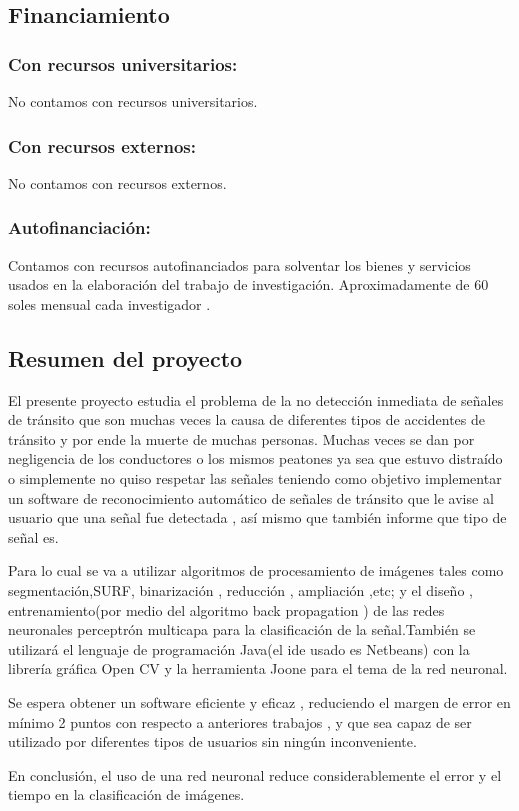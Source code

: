 \documentclass[a4paper, 12pt]{article}
\begin{document}
\subsection{Financiamiento}
\subsubsection{ {\bf	Con recursos universitarios:}}  No contamos con recursos universitarios.
\subsubsection{ {\bf Con recursos externos:}} No contamos con recursos externos.
\subsubsection{ {\bf Autofinanciación:}} Contamos con recursos autofinanciados para solventar los bienes y servicios usados en la elaboración del trabajo de investigación. Aproximadamente de 60 soles mensual cada investigador .

\subsection{Resumen del proyecto}
El presente proyecto estudia el problema de la no detección inmediata de señales de tránsito que son muchas veces la causa de diferentes tipos de accidentes de tránsito y por ende la muerte de muchas personas. Muchas veces se dan por negligencia de los conductores o los mismos peatones ya sea que estuvo distraído o simplemente no quiso respetar las señales teniendo como objetivo implementar un software de reconocimiento automático de señales de tránsito que le avise al usuario que una señal fue detectada , así mismo que también informe que tipo de señal es.\par
\vskip 0.6cm
Para lo cual se va a utilizar  algoritmos de procesamiento de imágenes  tales como segmentación,SURF, binarización , reducción , ampliación ,etc; y el diseño , entrenamiento(por medio del algoritmo back propagation ) de las redes neuronales perceptrón multicapa para la clasificación de la señal.También se utilizará el lenguaje de programación Java(el ide usado es Netbeans) con la librería gráfica Open CV y la herramienta Joone para el tema de la red neuronal.\par
\vskip 0.6cm
Se espera obtener un software eficiente y eficaz , reduciendo el margen de error en mínimo 2 puntos con respecto a anteriores trabajos , y que sea capaz de ser utilizado por diferentes tipos de usuarios sin ningún inconveniente.\par
\vskip 0.6cm
En conclusión, el uso de una red neuronal reduce considerablemente el error y el tiempo en la clasificación de imágenes.\par
\end{document}
